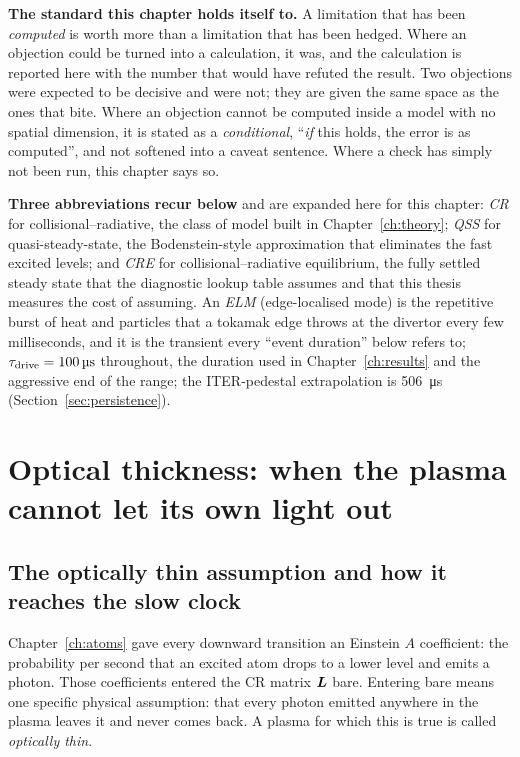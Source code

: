 \medskip
\noindent\textbf{The standard this chapter holds itself to.} A limitation that
has been \emph{computed} is worth more than a limitation that has been hedged.
Where an objection could be turned into a calculation, it was, and the
calculation is reported here with the number that would have refuted the
result. Two objections were expected to be decisive and were not; they are given
the same space as the ones that bite. Where an objection cannot be computed
inside a model with no spatial dimension, it is stated as a \emph{conditional},
``\emph{if} this holds, the error is as computed'', and not softened into a
caveat sentence. Where a check has simply not been run, this chapter says so.

\medskip
\noindent\textbf{Three abbreviations recur below} and are expanded here for
this chapter: \emph{CR} for collisional--radiative, the class of model built in
Chapter~\ref{ch:theory}; \emph{QSS} for quasi-steady-state, the Bodenstein-style
approximation that eliminates the fast excited levels; and \emph{CRE} for
collisional--radiative equilibrium, the fully settled steady state that the
diagnostic lookup table assumes and that this thesis measures the cost of
assuming. An \emph{ELM} (edge-localised mode) is the repetitive burst of
heat and particles that a tokamak edge throws at the divertor every few
milliseconds, and it is the transient every ``event duration'' below refers to;
$\tau_{\mathrm{drive}} = \SI{100}{\micro\second}$ throughout, the duration used in
Chapter~\ref{ch:results} and the aggressive end of the range; the
ITER-pedestal extrapolation is \SI{506}{\micro\second}
\cite[Sec.~5]{Loarte2003} (Section~\ref{sec:persistence}).

\section{Optical thickness: when the plasma cannot let its own light out}
\label{sec:opacity}

\subsection{The optically thin assumption and how it reaches the slow clock}

Chapter~\ref{ch:atoms} gave every downward transition an Einstein $A$
coefficient: the probability per second that an excited atom drops to a lower
level and emits a photon. Those coefficients entered the CR matrix $\bm{L}$
bare. Entering bare means one specific physical assumption: that every photon
emitted anywhere in the plasma leaves it and never comes back. A plasma for
which this is true is called \emph{optically thin}.

